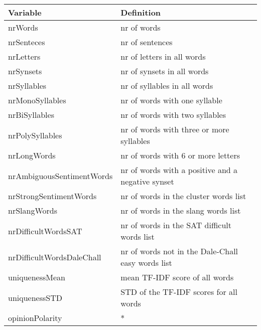 \begin{tabular}{|l|l|} \hline
\textbf{Variable} & \textbf{Definition} \\ \hline
nrWords & nr of words \\ \hline
nrSenteces & nr of sentences \\ \hline
nrLetters & nr of letters in all words \\ \hline
nrSynsets & nr of synsets in all words \\ \hline
nrSyllables & nr of syllables in all words \\ \hline
nrMonoSyllables & nr of words with one syllable \\ \hline
nrBiSyllables & nr of words with two syllables \\ \hline
nrPolySyllables & nr of words with three or more syllables \\ \hline
nrLongWords & nr of words with 6 or more letters \\ \hline
nrAmbiguousSentimentWords & nr of words with a positive and a negative synset \\ \hline
nrStrongSentimentWords & nr of words in the cluster words list \\ \hline
nrSlangWords & nr of words in the slang words list \\ \hline
nrDifficultWordsSAT & nr of words in the SAT difficult words list \\ \hline
nrDifficultWordsDaleChall & nr of words not in the Dale-Chall easy words list \\ \Xhline{3\arrayrulewidth}
uniquenessMean & mean TF-IDF score of all words \\ \hline
uniquenessSTD & STD of the TF-IDF scores for all words \\ \hline
opinionPolarity & * \\ 
\end{tabular}